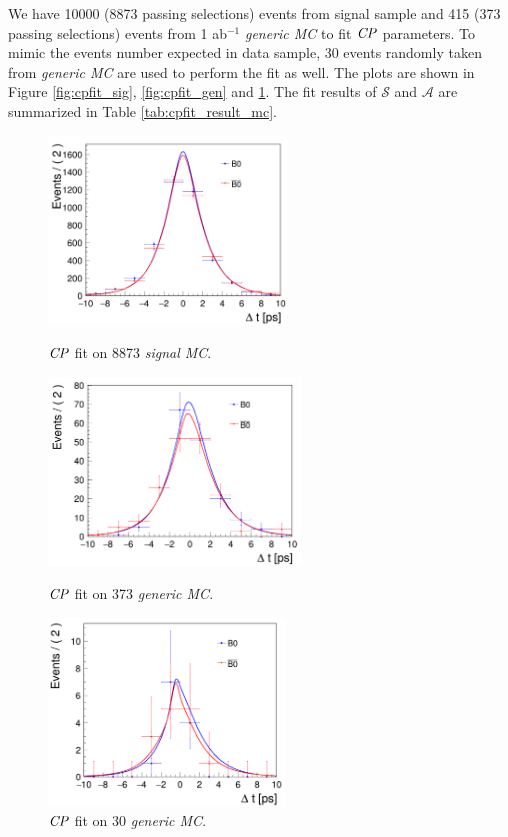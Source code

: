 We have 10000 (8873 passing selections) events from signal sample and 415 (373 passing selections) events from 1 ab$^{-1}$ \textit{generic MC} to fit $\it{CP}$ parameters. To mimic the events number expected in data sample, 30 events randomly taken from \textit{generic MC} are used to perform the fit as well. The plots are shown in Figure \ref{fig:cpfit_sig}, \ref{fig:cpfit_gen} and \ref{fig:cpfit_gen_data}. The fit results of $\mathcal{S}$ and $\mathcal{A}$ are summarized in Table \ref{tab:cpfit_result_mc}.
\begin{figure}[H]
	\begin{minipage}{0.5\linewidth}
		\includegraphics[height=5cm]{figures/cpfit-10000sig}
		\caption{$\it{CP}$ fit on 8873 \textit{signal MC}.}
		\label{fig:cpfit_sig}
	\end{minipage}
	\begin{minipage}{0.5\linewidth}
		\includegraphics[height=5cm]{figures/cpfit-373gen}
		\caption{$\it{CP}$ fit on 373 \textit{generic MC}.}
		\label{fig:cpfit_gen}
	\end{minipage}
\vspace{0.5cm}
	\begin{minipage}{1\linewidth}
		\centering
		\includegraphics[height=5cm]{figures/cpfit-30gen}
		\caption{$\it{CP}$ fit on 30 \textit{generic MC}.}
		\label{fig:cpfit_gen_data}
	\end{minipage}
\end{figure}


